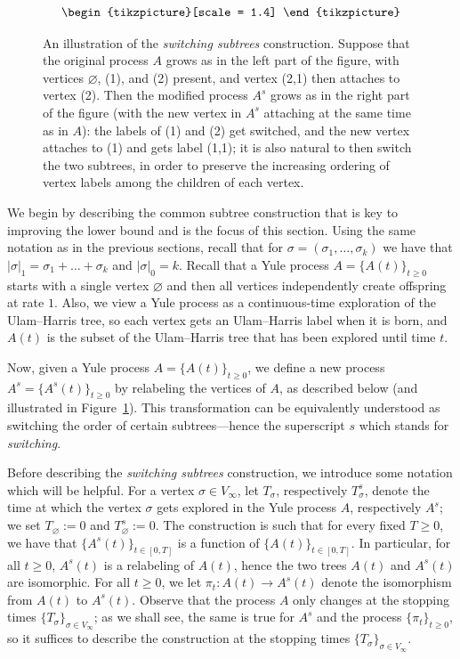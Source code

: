\documentclass[11pt]{article}
\numberwithin{equation}{section}
\theoremstyle{definition}
\begin{document}
\begin{figure}
\[\begin{tikzpicture}[scale = 1.4]
	\end{tikzpicture}\]
	\centering
 \caption{An illustration of the \emph{switching subtrees} construction. Suppose that the original process $A$ grows as in the left part of the figure, with vertices $\varnothing$, (1), and (2) present, and vertex (2,1) then attaches to vertex (2). Then the modified process $A^{s}$ grows as in the right part of the figure (with the new vertex in $A^{s}$ attaching at the same time as in $A$): the labels of (1) and (2) get switched, and the new vertex attaches to (1) and gets label (1,1); it is also natural to then switch the two subtrees, in order to preserve the increasing ordering of vertex labels among the children of each vertex.} 
 \label{fig:switching_subtrees}
\end{figure}

We begin by describing the common subtree construction that is key to improving the lower bound and is the focus of this section. Using the same notation as in the previous sections, recall that for $\sigma = (\sigma_1,\ldots,\sigma_k)$ we have that $|\sigma|_1 = \sigma_1 + \ldots + \sigma_k$ and $|\sigma|_0 = k$. 
Recall that a Yule process $A = \{ A(t) \}_{t \geq 0}$ starts with a single vertex $\varnothing$ and then all vertices independently create offspring at rate $1$. 
Also, 
we view a Yule process as a continuous-time exploration of the Ulam--Harris tree, so each vertex gets an Ulam--Harris label when it is born, and $A(t)$ is the subset of the Ulam--Harris tree that has been explored until time $t$. 

Now, given a Yule process $A = \{ A(t) \}_{t \geq 0}$, we define a new process $A^{s} = \{ A^{s}(t) \}_{t \geq 0}$ by 
relabeling the vertices of $A$, as described below (and illustrated in Figure~\ref{fig:switching_subtrees}). 
This transformation can be equivalently understood as switching the order of certain subtrees---hence the superscript $s$ which stands for \textit{switching}. 

Before describing the \emph{switching subtrees} construction, we introduce some notation which will be helpful. 
For a vertex $\sigma \in V_{\infty}$, let $T_{\sigma}$, respectively $T_{\sigma}^s$, denote the time at which the vertex $\sigma$ gets explored in the Yule process $A$, respectively $A^s$; 
we set $T_{\varnothing} :=0$ and $T_{\varnothing}^{s} := 0$. 
The construction is such that for every fixed $T \geq 0$, we have that 
$\{ A^{s}(t) \}_{t \in [0,T]}$ is a function of $\{ A(t) \}_{t \in [0,T]}$. In particular, for all $t \geq 0$, $A^{s}(t)$ is a relabeling of $A(t)$, hence the two trees $A(t)$ and $A^{s}(t)$ are isomorphic. 
For all $t \geq 0$, we let $\pi_{t}: A(t) \to A^{s}(t)$ denote the isomorphism from $A(t)$ to $A^{s}(t)$.
Observe that the process $A$ only changes at the stopping times $\{ T_{\sigma} \}_{\sigma \in V_{\infty}}$; 
as we shall see, the same is true for $A^{s}$ and the process $\{ \pi_{t} \}_{t \geq 0}$, so it suffices to describe the construction at the stopping times $\{ T_{\sigma} \}_{\sigma \in V_{\infty}}$. 
\end{document}
